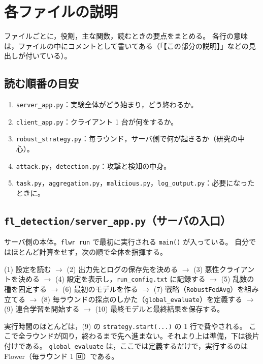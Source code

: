 \documentclass[a4j, dvipdfmx]{jsarticle}  %
\begin{document}
\section{各ファイルの説明}
\label{sec:files}

ファイルごとに，役割，主な関数，読むときの要点をまとめる。
各行の意味は，ファイルの中にコメントとして書いてある（「【この部分の説明】」などの見出しが付いている）。

\subsection{読む順番の目安}

\begin{enumerate}
  \item \texttt{server\_app.py}：実験全体がどう始まり，どう終わるか。
  \item \texttt{client\_app.py}：クライアント 1 台が何をするか。
  \item \texttt{robust\_strategy.py}：毎ラウンド，サーバ側で何が起きるか（研究の中心）。
  \item \texttt{attack.py}，\texttt{detection.py}：攻撃と検知の中身。
  \item \texttt{task.py}，\texttt{aggregation.py}，\texttt{malicious.py}，\texttt{log\_output.py}：必要になったときに。
\end{enumerate}

\subsection{\texttt{fl\_detection/server\_app.py}（サーバの入口）}

\begin{description}[leftmargin=1.4em, style=nextline]
  \item[役割] サーバ側の本体。\texttt{flwr run} で最初に実行される \texttt{main()} が入っている。
        自分ではほとんど計算をせず，次の順で全体を指揮する。
  \item[流れ]
        (1) 設定を読む $\rightarrow$
        (2) 出力先とログの保存先を決める $\rightarrow$
        (3) 悪性クライアントを決める $\rightarrow$
        (4) 設定を表示し，\texttt{run\_config.txt} に記録する $\rightarrow$
        (5) 乱数の種を固定する $\rightarrow$
        (6) 最初のモデルを作る $\rightarrow$
        (7) 戦略（\texttt{RobustFedAvg}）を組み立てる $\rightarrow$
        (8) 毎ラウンドの採点のしかた（\texttt{global\_evaluate}）を定義する $\rightarrow$
        (9) 連合学習を開始する $\rightarrow$
        (10) 最終モデルと最終結果を保存する。
  \item[要点] 実行時間のほとんどは，(9) の \texttt{strategy.start(...)} の 1 行で費やされる。
        ここで全ラウンドが回り，終わるまで先へ進まない。それより上は準備，下は後片付けである。
        \texttt{global\_evaluate} は，ここでは定義するだけで，実行するのは Flower（毎ラウンド 1 回）である。
\end{description}
\end{document}

